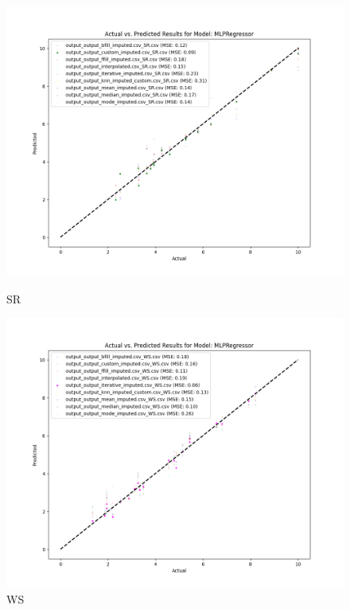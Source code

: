 \begin{figure}[H]
    \centering
    \begin{minipage}{0.495\textwidth}
        \centering
        \includegraphics[width=\linewidth]{reg_section_specific/images_reg_training/SR_MLPRegressor_plot.png}
        \caption{SR}
        \label{fig_reg_spec:sr_reg_training}
    \end{minipage}\hfill
    \begin{minipage}{0.495\textwidth}
        \centering
        \includegraphics[width=\linewidth]{reg_section_specific/images_reg_training/WS_MLPRegressor_plot.png}
        \caption{WS}
        \label{fig_reg_spec:ws_reg_training}
    \end{minipage}
\end{figure}

